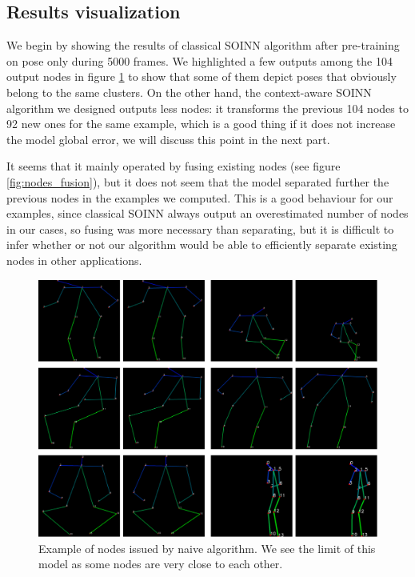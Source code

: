 \subsection{Results visualization}
We begin by showing the results of classical SOINN algorithm after pre-training on pose only during 5000 frames. We highlighted a few outputs among the 104 output nodes in figure \ref{fig:similar_nodes} to show that some of them depict poses that obviously belong to the same clusters. On the other hand, the context-aware SOINN algorithm we designed outputs less nodes: it transforms the previous 104 nodes to 92 new ones for the same example, which is a good thing if it does not increase the model global error, we will discuss this point in the next part.

It seems that it mainly operated by fusing existing nodes (see figure \ref{fig:nodes_fusion}), but it does not seem that the model separated further the previous nodes in the examples we computed. This is a good behaviour for our examples, since classical SOINN always output an overestimated number of nodes in our cases, so fusing was more necessary than separating, but it is difficult to infer whether or not our algorithm would be able to efficiently separate existing nodes in other applications.

\begin{figure}[htp]
    \centering
    \includegraphics[width=150mm, keepaspectratio]{images/similar_nodes.png}
    \caption[Example of nodes issued by naive algorithm]{Example of nodes issued by naive algorithm. We see the limit of this model as some nodes are very close to each other.}
    \label{fig:similar_nodes}
\end{figure}

